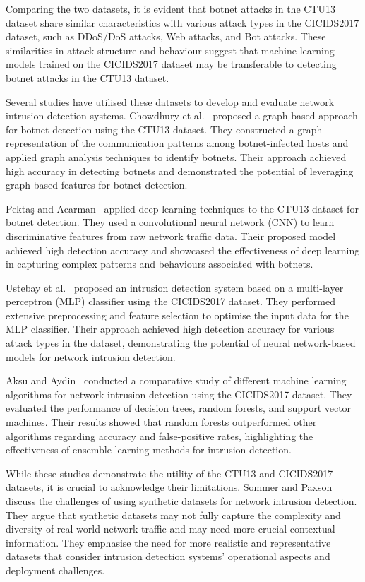 Comparing the two datasets, it is evident that botnet attacks in the CTU13 dataset share similar characteristics with various attack types in the CICIDS2017 dataset, such as DDoS/DoS attacks, Web attacks, and Bot attacks. These similarities in attack structure and behaviour suggest that machine learning models trained on the CICIDS2017 dataset may be transferable to detecting botnet attacks in the CTU13 dataset.

Several studies have utilised these datasets to develop and evaluate network intrusion detection systems. Chowdhury et al.~\cite{chowdhury2017botnet} proposed a graph-based approach for botnet detection using the CTU13 dataset. They constructed a graph representation of the communication patterns among botnet-infected hosts and applied graph analysis techniques to identify botnets. Their approach achieved high accuracy in detecting botnets and demonstrated the potential of leveraging graph-based features for botnet detection.

Pektaş and Acarman~\cite{pektacs2019deep} applied deep learning techniques to the CTU13 dataset for botnet detection. They used a convolutional neural network (CNN) to learn discriminative features from raw network traffic data. Their proposed model achieved high detection accuracy and showcased the effectiveness of deep learning in capturing complex patterns and behaviours associated with botnets.

Ustebay et al.~\cite{ustebay2018intrusion} proposed an intrusion detection system based on a multi-layer perceptron (MLP) classifier using the CICIDS2017 dataset. They performed extensive preprocessing and feature selection to optimise the input data for the MLP classifier. Their approach achieved high detection accuracy for various attack types in the dataset, demonstrating the potential of neural network-based models for network intrusion detection.

Aksu and Aydin~\cite{aksu2018detecting} conducted a comparative study of different machine learning algorithms for network intrusion detection using the CICIDS2017 dataset. They evaluated the performance of decision trees, random forests, and support vector machines. Their results showed that random forests outperformed other algorithms regarding accuracy and false-positive rates, highlighting the effectiveness of ensemble learning methods for intrusion detection.

While these studies demonstrate the utility of the CTU13 and CICIDS2017 datasets, it is crucial to acknowledge their limitations. Sommer and Paxson~\cite{sommer2010outside} discuss the challenges of using synthetic datasets for network intrusion detection. They argue that synthetic datasets may not fully capture the complexity and diversity of real-world network traffic and may need more crucial contextual information. They emphasise the need for more realistic and representative datasets that consider intrusion detection systems' operational aspects and deployment challenges.

